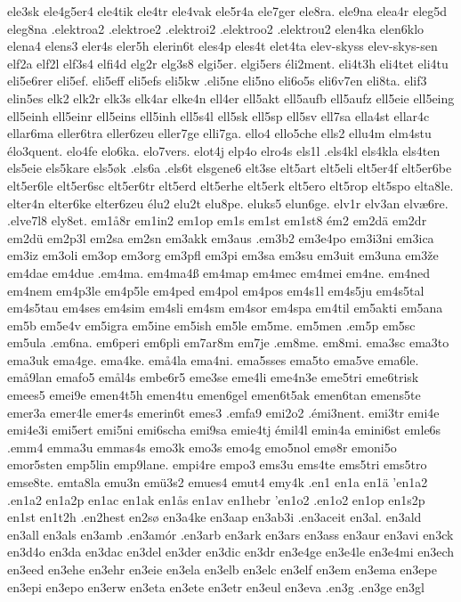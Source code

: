 ele3sk
ele4g5er4
ele4tik
ele4tr
ele4vak
ele5r4a
ele7ger
ele8ra.
ele9na
elea4r
eleg5d
eleg8na
.elektroa2
.elektroe2
.elektroi2
.elektroo2
.elektrou2
elen4ka
elen6klo
elena4
elens3
eler4s
eler5h
elerin6t
eles4p
eles4t
elet4ta
elev-skyss
elev-skys-sen
elf2a
elf2l
elf3s4
elfi4d
elg2r
elg3s8
elgi5er.
elgi5ers
éli2ment.
eli4t3h
eli4tet
eli4tu
eli5e6rer
eli5ef.
eli5eff
eli5efs
eli5kw
.eli5ne
eli5no
eli6o5s
eli6v7en
eli8ta.
elif3
elin5es
elk2
elk2r
elk3s
elk4ar
elke4n
ell4er
ell5akt
ell5aufb
ell5aufz
ell5eie
ell5eing
ell5einh
ell5einr
ell5eins
ell5inh
ell5s4l
ell5sk
ell5sp
ell5sv
ell7sa
ella4st
ellar4c
ellar6ma
eller6tra
eller6zeu
eller7ge
elli7ga.
ello4
ello5che
ells2
ellu4m
elm4stu
élo3quent.
elo4fe
elo6ka.
elo7vers.
elot4j
elp4o
elro4s
els1l
.els4kl
els4kla
els4ten
els5eie
els5kare
els5øk
.els6a
.els6t
elsgene6
elt3se
elt5art
elt5eli
elt5er4f
elt5er6be
elt5er6le
elt5er6sc
elt5er6tr
elt5erd
elt5erhe
elt5erk
elt5ero
elt5rop
elt5spo
elta8le.
elter4n
elter6ke
elter6zeu
élu2
elu2t
elu8pe.
eluks5
elun6ge.
elv1r
elv3an
elvæ6re.
.elve7l8
ely8et.
em1å8r
em1in2
em1op
em1s
em1st
em1st8
ém2
em2dä
em2dr
em2dü
em2p3l
em2sa
em2sn
em3akk
em3aus
.em3b2
em3e4po
em3i3ni
em3ica
em3iz
em3oli
em3op
em3org
em3pfl
em3pi
em3sa
em3su
em3uit
em3una
em3že
em4dae
em4due
.em4ma.
em4ma4ß
em4map
em4mec
em4mei
em4ne.
em4ned
em4nem
em4p3le
em4p5le
em4ped
em4pol
em4pos
em4s1l
em4s5ju
em4s5tal
em4s5tau
em4ses
em4sim
em4sli
em4sm
em4sor
em4spa
em4til
em5akti
em5ana
em5b
em5e4v
em5igra
em5ine
em5ish
em5le
em5me.
em5men
.em5p
em5sc
em5ula
.em6na.
em6peri
em6pli
em7ar8m
em7je
.em8me.
em8mi.
ema3sc
ema3to
ema3uk
ema4ge.
ema4ke.
emå4la
ema4ni.
ema5sses
ema5to
ema5ve
ema6le.
emå9lan
emafo5
emål4s
embe6r5
eme3se
eme4li
eme4n3e
eme5tri
eme6trisk
emees5
emei9e
emen4t5h
emen4tu
emen6gel
emen6t5ak
emen6tan
emens5te
emer3a
emer4le
emer4s
emerin6t
emes3
.emfa9
emi2o2
.émi3nent.
emi3tr
emi4e
emi4e3i
emi5ert
emi5ni
emi6scha
emi9sa
emie4tj
émil4l
emin4a
emini6st
emle6s
.emm4
emma3u
emmas4s
emo3k
emo3s
emo4g
emo5nol
emø8r
emoni5o
emor5sten
emp5lin
emp9lane.
empi4re
empo3
ems3u
ems4te
ems5tri
ems5tro
emse8te.
emta8la
emu3n
emü3s2
emues4
emut4
emy4k
.en1
en1a
en1ä
'en1a2
.en1a2
en1a2p
en1ac
en1ak
en1ås
en1av
en1hebr
'en1o2
.en1o2
en1op
en1s2p
en1st
en1t2h
.en2hest
en2sø
en3a4ke
en3aap
en3ab3i
.en3aceit
en3al.
en3ald
en3all
en3als
en3amb
.en3amór
.en3arb
en3ark
en3ars
en3ass
en3aur
en3avi
en3ck
en3d4o
en3da
en3dac
en3del
en3der
en3dic
en3dr
en3e4ge
en3e4le
en3e4mi
en3ech
en3eed
en3ehe
en3ehr
en3eie
en3ela
en3elb
en3elc
en3elf
en3em
en3ema
en3epe
en3epi
en3epo
en3erw
en3eta
en3ete
en3etr
en3eul
en3eva
.en3g
.en3ge
en3gl
